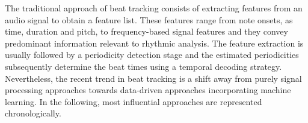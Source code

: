 \documentclass{scrartcl}
\begin{document}
The traditional approach of beat tracking consists of extracting features from an audio signal to obtain a feature list. These features range from note onsets, as time, duration and pitch, to frequency-based signal features and they convey predominant information relevant to rhythmic analysis. The feature extraction is usually followed by a periodicity detection stage and the estimated periodicities subsequently determine the beat times using a temporal decoding strategy. Nevertheless, the recent trend in beat tracking is a shift away from purely signal processing approaches towards data-driven approaches incorporating machine learning. In the following, most influential approaches are represented chronologically. 



\end{document}
